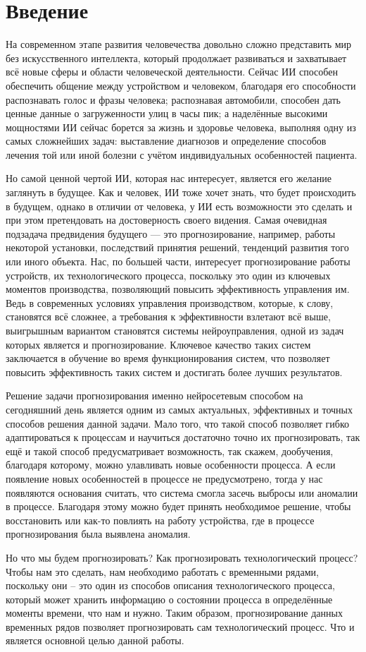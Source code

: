 \chapter*{Введение}

На современном этапе развития человечества довольно сложно представить мир без искусственного интеллекта, который продолжает развиваться и захватывает всё новые сферы и области человеческой деятельности. Сейчас ИИ способен обеспечить общение между устройством и человеком, благодаря его способности распознавать голос и фразы человека; распознавая автомобили, способен дать ценные данные о загруженности улиц в часы пик; а наделённые высокими мощностями ИИ сейчас борется за жизнь и здоровье человека, выполняя одну из самых сложнейших задач: выставление диагнозов и определение способов лечения той или иной болезни с учётом индивидуальных особенностей пациента. 

Но самой ценной чертой ИИ, которая нас интересует, является его желание заглянуть в будущее. Как и человек, ИИ тоже хочет знать, что будет происходить в будущем, однако в отличии от человека, у ИИ есть возможности это сделать и при этом претендовать на достоверность своего видения. Самая очевидная подзадача предвидения будущего — это прогнозирование, например, работы некоторой установки, последствий принятия решений, тенденций развития того или иного объекта. Нас, по большей части, интересует прогнозирование работы устройств, их технологического процесса, поскольку это один из ключевых моментов производства, позволяющий повысить эффективность управления им. Ведь в современных условиях управления производством, которые, к слову, становятся всё сложнее, а требования к эффективности взлетают всё выше, выигрышным вариантом становятся системы нейроуправления, одной из задач которых является и прогнозирование. Ключевое качество таких систем заключается в обучение во время функционирования систем, что позволяет повысить эффективность таких систем и достигать более лучших результатов.

Решение задачи прогнозирования именно нейросетевым способом на сегодняшний день является одним из самых актуальных, эффективных и точных способов решения данной задачи. Мало того, что такой способ позволяет гибко адаптироваться к процессам и научиться достаточно точно их прогнозировать, так ещё и такой способ предусматривает возможность, так скажем, дообучения, благодаря которому, можно улавливать новые особенности процесса. А если появление новых особенностей в процессе не предусмотрено, тогда у нас появляются основания считать, что система смогла засечь выбросы или аномалии в процессе. Благодаря этому можно будет принять необходимое решение, чтобы восстановить или как-то повлиять на работу устройства, где в процессе прогнозирования была выявлена аномалия. 

Но что мы будем прогнозировать? Как прогнозировать технологический процесс? Чтобы нам это сделать, нам необходимо работать с временными рядами, поскольку они – это один из способов описания технологического процесса, который может хранить информацию о состоянии процесса в определённые моменты времени, что нам и нужно. Таким образом, прогнозирование данных временных рядов позволяет прогнозировать сам технологический процесс. Что и является основной целью данной работы.
